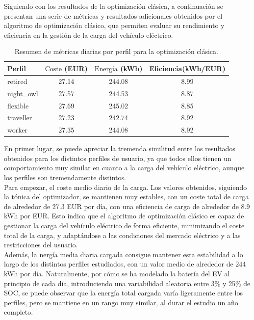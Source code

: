 Siguiendo con los resultados de la optimización clásica, a continuación se presentan una serie de
métricas y resultados adicionales obtenidos por el algoritmo de optimización clásico, que
permiten evaluar su rendimiento y eficiencia en la gestión de la carga del vehículo eléctrico.
\begin{table}[H]
    \centering
    \begin{tabular}{lccc}
        \textbf{Perfil} & $\overline{\text{Coste}}$ (EUR) & $\overline{\text{Energía}}$ (kWh) & Eficiencia(kWh/EUR) \\
        \midrule
        retired & 27.14  & 244.08 & 8.99 \\
        night\_owl & 27.57  & 244.53 & 8.87 \\
        flexible & 27.69  & 245.02 & 8.85 \\
        traveller & 27.23  & 242.74 & 8.92 \\
        worker & 27.35  & 244.08 & 8.92 \\
        \bottomrule
    \end{tabular}
    \caption{Resumen de métricas diarias por perfil para la optimización clásica.}
    \label{tab:metrics_opt_classic_aligned}
\end{table}

En primer lugar, se puede apreciar la tremenda similitud entre los resultados obtenidos
para los distintos perfiles de usuario, ya que todos ellos tienen un comportamiento muy similar
en cuanto a la carga del vehículo eléctrico, aunque los perfiles son tremendamente distintos.\\

Para empezar, el coste medio diario de la carga. Los valores obtenidos, siguiendo la tónica del 
optimizador, se mantienen muy estables, con un coste total de carga de alrededor de 27.3 EUR por 
día, con una eficiencia de carga de alrededor de 8.9 kWh por EUR. Esto indica que el algoritmo de 
optimización clásico es capaz de gestionar la carga del vehículo eléctrico de forma eficiente, 
minimizando el coste total de la carga, y adaptándose a las condiciones del mercado eléctrico y a 
las restricciones del usuario.\\

Además, la nergía media diaria cargada consigue mantener esta estabilidad a lo largo de los 
distintos perfiles estudiados, con un valor medio de alrededor de 244 kWh por día. Naturalmente, por 
cómo se ha modelado la batería del EV al principio de cada día, introduciendo una variabilidad
aleatoria entre 3\% y 25\% de SOC, se puede observar que la energía total cargada varía ligeramente 
entre los perfiles, pero se mantiene en un rango muy similar, al durar el estudio un año completo.\\

